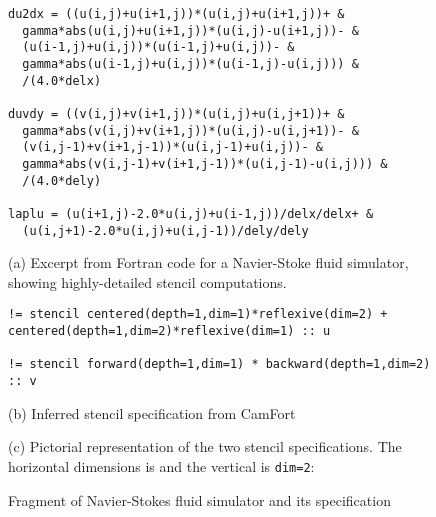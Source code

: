 \documentclass[9pt]{sigplanconf}
\theoremstyle{definition}
\begin{document}
\begin{figure}[t]
  \begin{verbatim}
du2dx = ((u(i,j)+u(i+1,j))*(u(i,j)+u(i+1,j))+ &
  gamma*abs(u(i,j)+u(i+1,j))*(u(i,j)-u(i+1,j))- &
  (u(i-1,j)+u(i,j))*(u(i-1,j)+u(i,j))- &
  gamma*abs(u(i-1,j)+u(i,j))*(u(i-1,j)-u(i,j))) &
  /(4.0*delx)

duvdy = ((v(i,j)+v(i+1,j))*(u(i,j)+u(i,j+1))+ &
  gamma*abs(v(i,j)+v(i+1,j))*(u(i,j)-u(i,j+1))- &
  (v(i,j-1)+v(i+1,j-1))*(u(i,j-1)+u(i,j))- &
  gamma*abs(v(i,j-1)+v(i+1,j-1))*(u(i,j-1)-u(i,j))) &
  /(4.0*dely)

laplu = (u(i+1,j)-2.0*u(i,j)+u(i-1,j))/delx/delx+ &
  (u(i,j+1)-2.0*u(i,j)+u(i,j-1))/dely/dely
\end{verbatim}
(a) Excerpt from Fortran code for a Navier-Stoke fluid simulator,
showing highly-detailed stencil computations. \\


\begin{verbatim}
!= stencil centered(depth=1,dim=1)*reflexive(dim=2) + centered(depth=1,dim=2)*reflexive(dim=1) :: u

!= stencil forward(depth=1,dim=1) * backward(depth=1,dim=2) :: v
\end{verbatim}
(b) Inferred stencil specification from CamFort

\begin{center}
\end{center}
(c) Pictorial representation of the two stencil specifications.
The horizontal dimensions is  and the vertical is \texttt{dim=2}:
\caption{Fragment of Navier-Stokes fluid simulator and its specification}
\label{ref:navier-stokes-fragment}
\end{figure}
\end{document}
